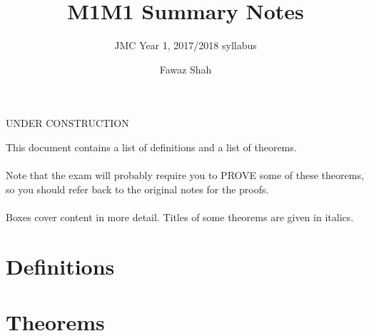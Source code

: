 \documentclass{scrartcl}
\title{M1M1 Summary Notes}
\subtitle{JMC Year 1, 2017/2018 syllabus}
\date{}
\author{Fawaz Shah}
\begin{document}
\large
\maketitle
\begin{center}
UNDER CONSTRUCTION
\end{center}
\noindent This document contains a list of definitions and a list of theorems.
\\\\
Note that the exam will probably require you to PROVE some of these theorems, so you should refer back to the original notes for the proofs.
\\\\
Boxes cover content in more detail. Titles of some theorems are given in italics.
\tableofcontents
\newpage
\section{Definitions}

\section{Theorems}
\end{document}
